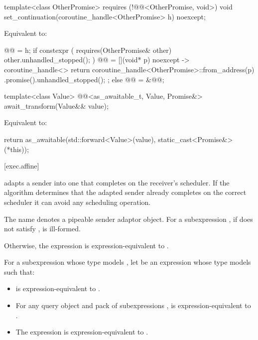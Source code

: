 %
\begin{itemdecl}
template<class OtherPromise>
  requires (!@@<OtherPromise, void>)
void set_continuation(coroutine_handle<OtherPromise> h) noexcept;
\end{itemdecl}

\begin{itemdescr}
\pnum
\effects
Equivalent to:
\begin{codeblock}
@@ = h;
if constexpr ( requires(OtherPromise& other) { other.unhandled_stopped(); } ) {
  @@ = [](void* p) noexcept -> coroutine_handle<> {
    return coroutine_handle<OtherPromise>::from_address(p)
      .promise().unhandled_stopped();
  };
} else {
  @@ = &@@;
}
\end{codeblock}
\end{itemdescr}

%
\begin{itemdecl}
template<class Value>
@@<as_awaitable_t, Value, Promise&> await_transform(Value&& value);
\end{itemdecl}

\begin{itemdescr}
\pnum
\effects
Equivalent to:
\begin{codeblock}
return as_awaitable(std::forward<Value>(value), static_cast<Promise&>(*this));
\end{codeblock}
\end{itemdescr}

[exec.affine]{}

\pnum
{} adapts a sender into one that completes on
the receiver's scheduler.
If the algorithm determines that the adapted sender already completes
on the correct scheduler it can avoid any scheduling operation.

\pnum
The name  denotes a pipeable sender adaptor
object.
For a subexpression , if 
does not satisfy , 
is ill-formed.

\pnum
Otherwise, the expression  is
expression-equivalent to .

\pnum
For a subexpression  whose type models ,
let  be an expression 
whose type models  such that:
\begin{itemize}
\item
{} is expression-equivalent to .
\item
For any query object  and pack of subexpressions ,
 is expression-equivalent to
.
\item
The expression 
is expression-equivalent to .
\end{itemize}

